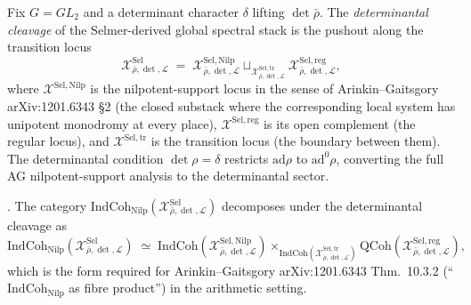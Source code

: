 \begin{definition}
\label{v4-arith:w5-h:def:det-cleavage}
Fix \(G=GL_{2}\) and a determinant character \(\delta\) lifting
\(\det\bar\rho\). The \emph{determinantal cleavage} of the
Selmer-derived global spectral stack is the pushout along the transition locus
\begin{equation}
\label{v4-arith:w5-h:eq:det-cleavage}
\mathcal{X}^{\mathrm{Sel}}_{\bar\rho,\det,\mathcal{L}}
\;=\;
\mathcal{X}^{\mathrm{Sel},\mathrm{Nilp}}_{\bar\rho,\det,\mathcal{L}}
\sqcup_{\mathcal{X}^{\mathrm{Sel},\mathrm{tr}}_{\bar\rho,\det,\mathcal{L}}}
\mathcal{X}^{\mathrm{Sel},\mathrm{reg}}_{\bar\rho,\det,\mathcal{L}},
\end{equation}
where \(\mathcal{X}^{\mathrm{Sel},\mathrm{Nilp}}\) is the
nilpotent-support locus in the sense of
Arinkin--Gaitsgory arXiv:1201.6343 \S2 (the closed substack where
the corresponding local system has unipotent monodromy at every
place), \(\mathcal{X}^{\mathrm{Sel},\mathrm{reg}}\) is its open
complement (the regular locus), and
\(\mathcal{X}^{\mathrm{Sel},\mathrm{tr}}\) is the transition locus
(the boundary between them). The determinantal condition
\(\det\rho=\delta\) restricts \(\mathrm{ad}\rho\) to \(\mathrm{ad}^{0}\rho\),
converting the full AG nilpotent-support analysis to the
determinantal sector.
\end{definition}

\begin{proposition}
\label{v4-arith:w5-h:prop:det-cleavage-identifies-indcoh}
\ClaimStatusProvedHere. The category
\(\mathrm{IndCoh}_{\mathrm{Nilp}}(\mathcal{X}^{\mathrm{Sel}}_{\bar\rho,\det,\mathcal{L}})\)
decomposes under the determinantal cleavage as
\begin{equation}
\label{v4-arith:w5-h:eq:indcoh-decomposition}
\mathrm{IndCoh}_{\mathrm{Nilp}}(\mathcal{X}^{\mathrm{Sel}}_{\bar\rho,\det,\mathcal{L}})
\;\simeq\;
\mathrm{IndCoh}(\mathcal{X}^{\mathrm{Sel},\mathrm{Nilp}}_{\bar\rho,\det,\mathcal{L}})
\times_{\mathrm{IndCoh}(\mathcal{X}^{\mathrm{Sel},\mathrm{tr}}_{\bar\rho,\det,\mathcal{L}})}
\mathrm{QCoh}(\mathcal{X}^{\mathrm{Sel},\mathrm{reg}}_{\bar\rho,\det,\mathcal{L}}),
\end{equation}
which is the form required for Arinkin--Gaitsgory arXiv:1201.6343
Thm.~10.3.2 (``\(\mathrm{IndCoh}_{\mathrm{Nilp}}\) as fibre product'')
in the arithmetic setting.
\end{proposition}

